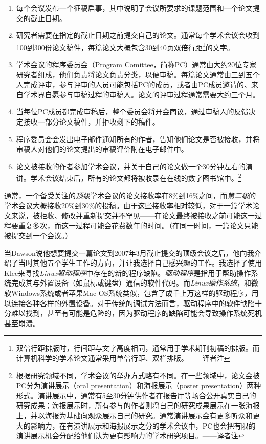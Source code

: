 \documentclass[letter,12pt]{book}
\begin{document}
\begin{CJK}{UTF8}{gbsn}
\begin{enumerate}
\item 每个会议发布一个征稿启事，其中说明了会议所要求的课题范围和一个论文提交的截止日期。
\item 研究者需要在指定的截止日期之前提交自己的论文。通常每个学术会议会收到100到300份论文稿件，每篇论文大概包含30到40页双倍行距\footnote{双倍行距排版时，行间距与文字高度相同，通常用于学术期刊初稿的排版。而计算机科学的学术论文通常采用单倍行距、双栏排版。——译者注}的文字。
\item 学术会议的程序委员会（Program Comittee，简称PC）通常由大约20位专家研究者组成，他们负责将论文负责分类，以便审稿。每篇论文通常由三到五个人完成评审，参与评审的人员可能包括PC的成员，或者由PC成员邀请的、来自学术界自愿参与审稿过程的审稿人。论文的评审过程通常需要大约三个月。
\item 当每位PC成员都完成审稿后，整个委员会将开会商议，通过审稿人的反馈决定接收一部分论文稿件，并拒收剩下的稿件。
\item 程序委员会会发出电子邮件通知所有的作者，告知他们论文是否被接收，并将审稿人对他们的论文提出的审稿评价附在电子邮件中。
\item 论文被接收的作者参加学术会议，并关于自己的论文做一个30分钟左右的演讲。学术会议结束后，所有的论文都将被收录在在线的数字图书馆中。\footnote{根据研究领域不同，学术会议的举办方式略有不同。在一些领域中，论文会被PC分为演讲展示（oral presentation）和海报展示（poster presentation）两种形式。演讲展示中，通常有5至30分钟供作者在报告厅等场合公开真实自己的研究成果；海报展示时，所有参与的作者则将自己的研究成果展示在一张海报上，并以海报为基础向观众展示自己的研究。通常演讲展示会有更多听众和更大的影响力，在有演讲展示和海报展示之分的学术会议中，PC也会把有限的演讲展示机会分配给他们认为更有影响力的学术研究项目。——译者注}
\end{enumerate}

通常，一个备受关注的\emph{顶级}学术会议的论文接收率在8\%到16\%之间，而\emph{第二级}的学术会议大概接收20\%到30\%的投稿。由于这些接收率相对较低，对于一篇学术论文来说，被拒收、修改并重新提交并不罕见——在论文最终被接收之前可能这一过程要重复多次，而这一过程可能会花费数年的时间。（在同一时间，一篇论文只能被提交到一个会议。）

\breakline

当Dawson说他想要提交一篇论文到2007年3月截止提交的顶级会议之后，他向我介绍了当时其他五个学生工作的方向，并让我选择自己感兴趣的工作。我选择了使用Klee来寻找\emph{Linux驱动程序}中存在的新的程序缺陷。\emph{驱动程序}是指用于帮助操作系统完成其与外置设备（如鼠标或键盘）通信的软件代码。而\emph{Linux操作系统}，和微软Windows系统或者苹果Mac OS系统类似，包含了成千上万这样的驱动程序，用以连接各种各样的外置设备。对于传统的调试方法而言，驱动程序中的软件缺陷十分难以找到，甚至有可能是危险的，因为驱动程序的缺陷可能会导致操作系统死机甚至崩溃。


\end{CJK}
\end{document}
